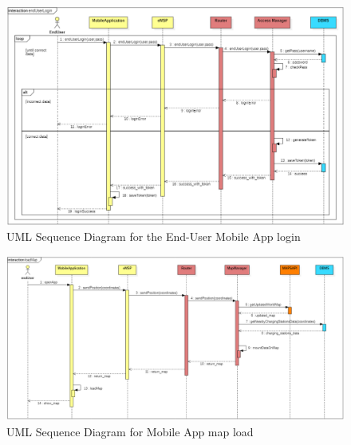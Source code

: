 \documentclass[a4paper]{report}
\begin{document}
\begin{landscape}
\begin{figure}[hp]
\centering
\includegraphics[scale=0.6]{img/sequenceLogin.png}
\caption{UML Sequence Diagram for the End-User Mobile App login}
\label{fig:seq-login}
\end{figure}
\end{landscape}

\begin{landscape}
\begin{figure}[hp]
\centering
\includegraphics[scale=0.6]{img/sequenceLoadMap.png}
\caption{UML Sequence Diagram for Mobile App map load}
\label{fig:seq-loadMap}
\end{figure}
\end{landscape}
\end{document}
